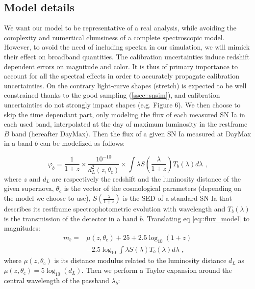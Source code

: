 \documentclass[\docopts]{\docclass}
\begin{document}
\subsection{Model details}
\label{subsec::model_details}
We want our model to be representative of a real analysis, while avoiding the complexity and numertical clumsiness of a complete spectroscopic model.
However, to avoid the need of including spectra in our simulation, we will mimick their effect on broadband quantities.
The calibration uncertainties induce redshift dependent errors on magnitude and color.
It is thus of primary importance to account for all the spectral effects in order to accurately propagate calibration uncertainties.
On the contrary light-curve shapes (stretch) is expected to be well constrained thanks to the good sampling (\ref{ssec::snsim}), and calibration uncertainties do not strongly impact shapes (e.g. \cite{1401.4064} Figure 6).
We then choose to skip the time dependant part, only modeling the flux of each measured SN Ia in each used band, interpolated at the day of maximum luminosity in the restframe $B$ band (hereafter DayMax).
Then the flux of a given SN Ia measured at DayMax in a band $b$ can be modelized as follows:

\begin{equation}
\label{eq::flux_model}
\varphi_b = \frac{1}{1+z} \times \frac{10^{-10}}{d_L^2(z, \theta_\text{c})}\times \int \lambda S(\frac{\lambda}{1+z}) T_b(\lambda) d\lambda \text{ ,}
\end{equation}
where $z$ and $d_L$ are respectively the redshift and the luminosity distance of the given supernova,
$\theta_\text{c}$ is the vector of the cosmological parameters (depending on the model we choose to use),
$S(\frac{\lambda}{1+z})$ is the SED of a standard SN Ia that describes its restframe spectrophotometric evolution with wavelength
and $T_b(\lambda)$ is the transmission of the detector in a band $b$.
Translating eq \ref{eq::flux_model} to magnitudes:
\begin{equation}
\begin{split}
\label{eq::raw_model}
m_b = &\mu(z, \theta_\text{c}) + 25 + 2.5\log_{10}(1+z) \\
&- 2.5\log_{10}\int \lambda S(\lambda) T_b(\lambda) d\lambda \text{ ,}
\end{split}
\end{equation}
where $\mu(z, \theta_\text{c})$ is its distance modulus related to the luminosity distance $d_L$ as $\mu(z, \theta_\text{c}) = 5\log_{10}(d_L)$.
Then we perform a Taylor expansion around the central wavelength of the passband $\bar\lambda_b$:
\end{document}
